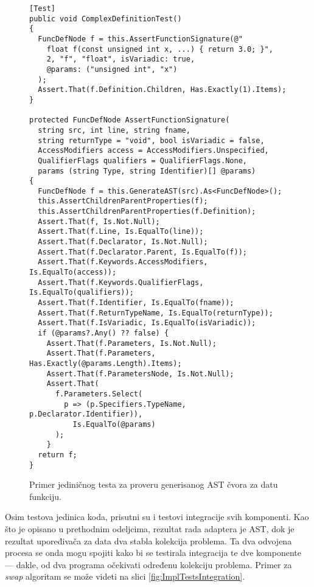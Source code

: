 \begin{figure}[h!]
\centering
\begin{lstlisting}
[Test]
public void ComplexDefinitionTest() 
{
  FuncDefNode f = this.AssertFunctionSignature(@"
    float f(const unsigned int x, ...) { return 3.0; }", 
    2, "f", "float", isVariadic: true, 
    @params: ("unsigned int", "x")
  );
  Assert.That(f.Definition.Children, Has.Exactly(1).Items);
}

protected FuncDefNode AssertFunctionSignature(
  string src, int line, string fname, 
  string returnType = "void", bool isVariadic = false, 
  AccessModifiers access = AccessModifiers.Unspecified,
  QualifierFlags qualifiers = QualifierFlags.None, 
  params (string Type, string Identifier)[] @params) 
{
  FuncDefNode f = this.GenerateAST(src).As<FuncDefNode>();
  this.AssertChildrenParentProperties(f);
  this.AssertChildrenParentProperties(f.Definition);
  Assert.That(f, Is.Not.Null);
  Assert.That(f.Line, Is.EqualTo(line));
  Assert.That(f.Declarator, Is.Not.Null);
  Assert.That(f.Declarator.Parent, Is.EqualTo(f));
  Assert.That(f.Keywords.AccessModifiers, Is.EqualTo(access));
  Assert.That(f.Keywords.QualifierFlags, Is.EqualTo(qualifiers));
  Assert.That(f.Identifier, Is.EqualTo(fname));
  Assert.That(f.ReturnTypeName, Is.EqualTo(returnType));
  Assert.That(f.IsVariadic, Is.EqualTo(isVariadic));
  if (@params?.Any() ?? false) {
    Assert.That(f.Parameters, Is.Not.Null);
    Assert.That(f.Parameters, Has.Exactly(@params.Length).Items);
    Assert.That(f.ParametersNode, Is.Not.Null);
    Assert.That(
      f.Parameters.Select(
        p => (p.Specifiers.TypeName, p.Declarator.Identifier)), 
          Is.EqualTo(@params)
      );
    }
  return f;
}
\end{lstlisting}
\caption{Primer jediničnog testa za proveru generisanog AST čvora za datu funkciju.}
\label{fig:ImplTestsUnit}
\end{figure}

Osim testova jedinica koda, prisutni su i testovi integracije svih komponenti. Kao što je opisano u prethodnim odeljcima, rezultat rada adaptera je AST, dok je rezultat upoređivača za data dva stabla kolekcija problema. Ta dva odvojena procesa se onda mogu spojiti kako bi se testirala integracija te dve komponente --- dakle, od dva programa očekivati određenu kolekciju problema. Primer za \emph{swap} algoritam se može videti na slici \ref{fig:ImplTestsIntegration}.

